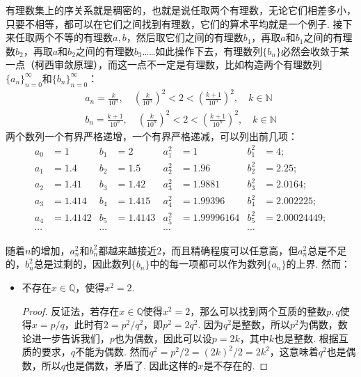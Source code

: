 \documentclass[main.tex]{subfiles}
\begin{document}
有理数集上的序关系就是稠密的，也就是说任取两个有理数，无论它们相差多小，只要不相等，都可以在它们之间找到有理数，它们的算术平均就是一个例子. 接下来任取两个不等的有理数\(a,b\)，然后取它们之间的有理数\(b_1\)，再取\(a\)和\(b_1\)之间的有理数\(b_2\)，再取\(a\)和\(b_2\)之间的有理数\(b_3\)……如此操作下去，有理数列\(\{b_n\}\)必然会收敛于某一点（柯西审敛原理），而这一点不一定是有理数，比如构造两个有理数列\(\{a_n\}_{n=0}^{\infty}\)和\(\{b_n\}_{n=0}^{\infty}\)：
\begin{eqnarray*}
    a_n=\frac{k}{10^n}, \quad\left(\frac{k}{10^n}\right)^2<2<\left(\frac{k+1}{10^n}\right)^2, \quad k\in\mathbb{N} \\
    b_n=\frac{k+1}{10^n}, \quad\left(\frac{k}{10^n}\right)^2<2<\left(\frac{k+1}{10^n}\right)^2, \quad k\in\mathbb{N}
\end{eqnarray*}
两个数列一个有界严格递增，一个有界严格递减，可以列出前几项：
\newline
\begin{align*}
    a_0 &= 1 & b_1 &= 2 & a_1^2 &= 1 & b_1^2 &= 4; \\
    a_1 &= 1.4 & b_2 &= 1.5 & a_2^2 &= 1.96 & b_2^2 &= 2.25; \\
    a_2 &= 1.41 & b_3 &= 1.42 & a_3^2 &= 1.9881 & b_3^2 &= 2.0164; \\
    a_3 &= 1.414 & b_4 &= 1.415 & a_4^2 &= 1.99396 & b_4^2 &= 2.002225; \\
    a_4 &= 1.4142 & b_5 &= 1.4143 & a_5^2 &= 1.99996164 & b_5^2 &= 2.00024449; \\
\cdots & & \cdots && \cdots && \cdots
\end{align*}

随着\(n\)的增加，\(a_n^2\)和\(b_n^2\)都越来越接近\(2\)，而且精确程度可以任意高，但\(a_n^2\)总是不足的，\(b_n^2\)总是过剩的，因此数列\(\{b_n\}\)中的每一项都可以作为数列\(\{a_n\}\)的上界. 然而：

\begin{itemize}
    \item 不存在\(x \in \mathbb{Q}\)，使得\(x^2 = 2\).
    \begin{proof}
        反证法，若存在\(x \in \mathbb{Q}\)使得\(x^2 = 2\)，那么可以找到两个互质的整数\(p,q\)使得\(x = p/q\)，此时有\(2 = p^2/q^2\)，即\(p^2 = 2q^2\). 因为\(q^2\)是整数，所以\(p^2\)为偶数，数论进一步告诉我们，\(p\)也为偶数，因此可以设\(p=2k\)，其中\(k\)也是整数. 根据互质的要求，\(q\)不能为偶数. 然而\(q^2 = p^2/2 = (2k)^2/2 = 2k^2\)，这意味着\(q^2\)也是偶数，所以\(q\)也是偶数，矛盾了. 因此这样的\(x\)是不存在的.
    \end{proof}
\end{itemize}
\end{document}
